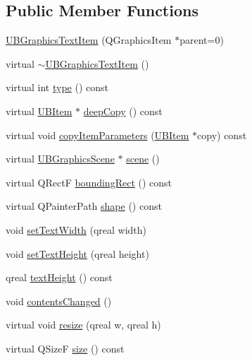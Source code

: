 \subsection*{Public Member Functions}
\begin{DoxyCompactItemize}
\item 
\hyperlink{class_u_b_graphics_text_item_acbf06a6d840ac7b6c95950e39dcd94b9}{U\-B\-Graphics\-Text\-Item} (Q\-Graphics\-Item $\ast$parent=0)
\item 
virtual \hyperlink{class_u_b_graphics_text_item_adfe3930eeff0d9591161ce108c171c28}{$\sim$\-U\-B\-Graphics\-Text\-Item} ()
\item 
virtual int \hyperlink{class_u_b_graphics_text_item_a987608d1449cdcb3b46eb6e6db680cf7}{type} () const 
\item 
virtual \hyperlink{class_u_b_item}{U\-B\-Item} $\ast$ \hyperlink{class_u_b_graphics_text_item_a6be4507f88dccb25e1e063ec36cf6f47}{deep\-Copy} () const 
\item 
virtual void \hyperlink{class_u_b_graphics_text_item_a14c3b9ff16071a306fe0834577aa26fa}{copy\-Item\-Parameters} (\hyperlink{class_u_b_item}{U\-B\-Item} $\ast$copy) const 
\item 
virtual \hyperlink{class_u_b_graphics_scene}{U\-B\-Graphics\-Scene} $\ast$ \hyperlink{class_u_b_graphics_text_item_a78498298ea53c6baee150a3a04a27f51}{scene} ()
\item 
virtual Q\-Rect\-F \hyperlink{class_u_b_graphics_text_item_a7c2191ecf4c0e619bbe1a80d00a68406}{bounding\-Rect} () const 
\item 
virtual Q\-Painter\-Path \hyperlink{class_u_b_graphics_text_item_aa0fc4432739063caa06b5294711935b3}{shape} () const 
\item 
void \hyperlink{class_u_b_graphics_text_item_a26591ecd60157acc96740175c5a15e94}{set\-Text\-Width} (qreal width)
\item 
void \hyperlink{class_u_b_graphics_text_item_a2da72b75372d127cedbc0123ba12c2f2}{set\-Text\-Height} (qreal height)
\item 
qreal \hyperlink{class_u_b_graphics_text_item_a7aa93056029f13ae3cdc9a7771e8748e}{text\-Height} () const 
\item 
void \hyperlink{class_u_b_graphics_text_item_a522f83321532b4e289086240a3bc49fc}{contents\-Changed} ()
\item 
virtual void \hyperlink{class_u_b_graphics_text_item_a9a461e55837ce00341381e2f2bb642e8}{resize} (qreal w, qreal h)
\item 
virtual Q\-Size\-F \hyperlink{class_u_b_graphics_text_item_a0c0d7265fa1888bdf1da4a7b793771ed}{size} () const 

\end{DoxyCompactItemize}
